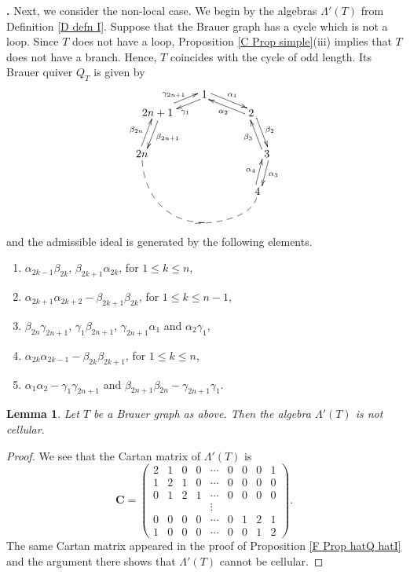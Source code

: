 \documentclass[12pt]{amsart}
\newtheorem{lem}[thm]{Lemma}
\def \para{\refstepcounter{thm} \par\medskip\noindent
                \textbf{\thethm .} }
\numberwithin{equation}{thm}
\newcommand\bC{\mathbf C}
\newcounter{ni}
\begin{document}
\para
Next, we consider the non-local case. We begin by the algebras $\Lambda'(T)$ from Definition \ref{D defn I}.
Suppose that the Brauer graph has a cycle which is not a loop. 
Since $T$ does not have a loop, Proposition \ref{C Prop simple}(iii) implies that $T$ does not have a branch. 
Hence, $T$ coincides with the cycle of odd length. Its Brauer quiver $Q_{T}$ is given by
\[
\begin{xy}
(0,11)*[o]+{1}="0",(15,5)*[o]+{2}="1",(20,-8)*[o]+{3}="2", (-15,5)*[oo]+{2n+1}="3",(-20,-8)*[o]+{2n}="4",
(17,-20)*[o]+{4}="5",(0,-30)*{}="dammy",
\ar @<1mm> "0";"1"^{\alpha_1}
\ar @<1mm> "1";"0"^{\alpha_2}
\ar @<1mm> "1";"2"^{\beta_2}
\ar @<1mm> "2";"1"^{\beta_3}
\ar @<1mm> "0";"3"^{\gamma_{1}}
\ar @<1mm> "3";"0"^{\gamma_{2n+1}}
\ar @<1mm> "4";"3"^{\beta_{2n}}
\ar @<1mm> "3";"4"^{\beta_{2n+1}}
\ar @<1mm> "2";"5"^{\alpha_{3}}
\ar @<1mm> "5";"2"^{\alpha_{4}}
\ar @{--}@(l,d) "dammy";"4"
\ar @{--}@(l,d) "dammy";"5"
\end{xy}
\]
and the admissible ideal is generated by the following elements.
\begin{enumerate}
\item $\alpha_{2k-1}\beta_{2k}$, $\beta_{2k+1}\alpha_{2k}$, for $1\leq k\leq n$, 
\item $\alpha_{2k+1}\alpha_{2k+2}-\beta_{2k+1}\beta_{2k}$, for $1\leq k\leq n-1$,
\item$\beta_{2n}\gamma_{2n+1}$, $\gamma_1\beta_{2n+1}$, $\gamma_{2n+1}\alpha_1$ and $\alpha_2\gamma_1$, 
\item $\alpha_{2k}\alpha_{2k-1}-\beta_{2k}\beta_{2k+1}$, for $1\leq k\leq n$,
\item $\alpha_{1}\alpha_{2}-\gamma_{1}\gamma_{2n+1}$ and $\beta_{2n+1}\beta_{2n}-\gamma_{2n+1}\gamma_{1}$.
\end{enumerate}

\begin{lem}
\label{D lem I-1}
Let $T$ be a Brauer graph as above. Then the algebra $\Lambda'(T)$ is not cellular.
\end{lem}
\begin{proof}
We see that the Cartan matrix of $\Lambda'(T)$ is
\[ \bC = \begin{pmatrix}
2 & 1 & 0 & 0 & \cdots & 0 & 0 & 0 & 1 \\ 
1 & 2 & 1 & 0 & \cdots & 0 & 0 & 0 & 0 \\
0 & 1 & 2 & 1 & \cdots & 0 & 0 & 0 & 0 \\ 
 &  &  &  & \vdots &  &  &  &  \\ 
0 & 0 & 0 & 0 & \cdots & 0 & 1 & 2 & 1 \\ 
1 & 0 & 0 & 0 & \cdots & 0 & 0 & 1 & 2 
\end{pmatrix}. \]
The same Cartan matrix appeared in the proof of Proposition \ref{F Prop hatQ hatI} and 
the argument there shows that $\Lambda'(T)$ cannot be cellular.
\end{proof}
\end{document}
